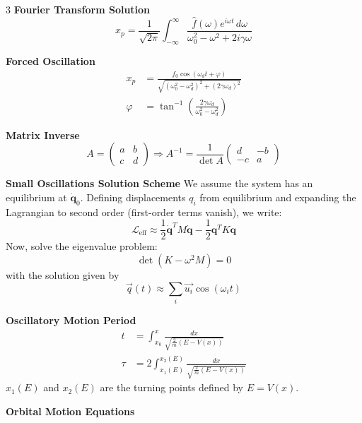 \documentclass[1pt]{article}
\begin{document}
\begin{multicols}{3}
\textbf{Fourier Transform Solution}
\begin{equation*}
    x_p = \frac{1}{\sqrt{2\pi}} \int_{-\infty}^{\infty} \frac{\hat{f}(\omega) e^{i\omega t}\, d\omega}{\omega_0^2 - \omega^2 + 2i\gamma\omega}
\end{equation*}

\textbf{Forced Oscillation}
\begin{align*}
    x_p &= \frac{f_0 \cos(\omega_d t + \varphi)}{\sqrt{(\omega_0^2 - \omega_d^2)^2 + (2\gamma\omega_d)^2}} \\
    \varphi &= \tan^{-1} \left( \frac{2\gamma\omega_d}{\omega_0^2 - \omega_d^2} \right)
\end{align*}

\textbf{Matrix Inverse}
\begin{equation*}
    A = \begin{pmatrix} a & b \\ c & d \end{pmatrix} \Rightarrow A^{-1} = \frac{1}{\det A} \begin{pmatrix} d & -b \\ -c & a \end{pmatrix}
\end{equation*}

\textbf{Small Oscillations Solution Scheme}
We assume the system has an equilibrium at $\dot{\mathbf{q}}_0$. Defining displacements \(q_i\) from equilibrium and expanding the Lagrangian to second order (first-order terms vanish), we write:
\[
\mathcal{L}_{\text{eff}} \approx \frac{1}{2} \dot{\mathbf{q}}^T M \dot{\mathbf{q}} - \frac{1}{2} \mathbf{q}^T K \mathbf{q}
\]
Now, solve the eigenvalue problem:
\[
\det \left( K - \omega^2 M \right) = 0
\]
with the solution given by
\[
\vec{q}(t)\approx\sum_i \vec{u_i}\cos(\omega_i t)
\]

\textbf{Oscillatory Motion Period}
\begin{align*}
        t &= \int_{x_0}^{x} \frac{dx}{\sqrt{\frac{2}{m} (E - V(x))}} \\
        \tau &= 2 \int_{x_1(E)}^{x_2(E)} \frac{dx}{\sqrt{\frac{2}{m} (E - V(x))}}
\end{align*}
\( x_1(E) \) and \( x_2(E) \) are the turning points defined by \( E = V(x) \).


\textbf{Orbital Motion Equations}


\end{multicols}
\end{document}
